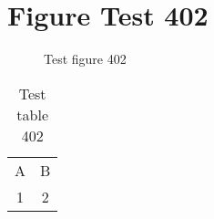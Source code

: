 \documentclass{article}
\begin{document}
\section{Figure Test 402}
\begin{figure}[h]
\caption{Test figure 402}
\end{figure}
\begin{table}[h]
\caption{Test table 402}
\begin{tabular}{cc}
A & B \\
1 & 2
\end{tabular}
\end{table}
\end{document}
